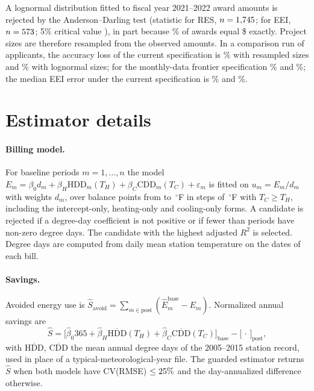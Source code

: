 \documentclass[11pt]{article}
\begin{document}
A lognormal distribution fitted to fiscal year 2021--2022 award amounts is rejected by
the Anderson--Darling test (statistic \AwardFitADRes{} for RES, $n=1{,}745$;
\AwardFitADEei{} for EEI, $n=573$; 5\% critical value \AwardFitADCritical),
in part because \AwardShareAtSmallCap\% of awards equal \$\SmallRequest{} exactly. Project sizes are therefore resampled from
the observed amounts. In a comparison run of \SizeSensN{} applicants, the accuracy loss of
the current specification is \SizeEmpCurrentMare\% with resampled sizes and
\SizeLognCurrentMare\% with lognormal sizes; for the monthly-data frontier specification
\SizeEmpRecMare\% and \SizeLognRecMare\%; the median EEI error under the current
specification is \SizeEmpEeiMedian\% and \SizeLognEeiMedian\%.

{\scriptsize

}

\begin{table}[h]
\caption{Triangular distributions of respondent time (minutes) before calibration.
Hypothetical values.}\label{tab:times}
\centering\footnotesize

\end{table}

\section{Estimator details}

\paragraph{Billing model.} For baseline periods $m=1,\dots,n$ the model
$E_m=\beta_0d_m+\beta_H\mathrm{HDD}_m(T_H)+\beta_C\mathrm{CDD}_m(T_C)+\varepsilon_m$ is
fitted on $u_m=E_m/d_m$ with weights $d_m$, over balance points from \CfgGridLow{} to
\CfgGridHigh$\,^\circ$F in steps of \CfgGridStep$\,^\circ$F with $T_C\ge T_H$, including the intercept-only, heating-only and cooling-only forms. A
candidate is rejected if a degree-day coefficient is not positive or if fewer than
\CfgMinNonzero{} periods have non-zero degree days. The candidate with the highest adjusted $R^2$ is
selected. Degree days are computed from daily mean station temperature on the dates of
each bill.

\paragraph{Savings.} Avoided energy use is
$\hat S_{\mathrm{avoid}}=\sum_{m\in\mathrm{post}}(\hat E^{\mathrm{base}}_m-E_m)$.
Normalized annual savings are
\begin{equation}
\hat S=\big[\hat\beta_0 365+\hat\beta_H\overline{\mathrm{HDD}}(T_H)+\hat\beta_C
\overline{\mathrm{CDD}}(T_C)\big]_{\mathrm{base}}-\big[\,\cdot\,\big]_{\mathrm{post}},
\end{equation}
with $\overline{\mathrm{HDD}}$, $\overline{\mathrm{CDD}}$ the mean annual degree days of
the 2005--2015 station record, used in place of a typical-meteorological-year file. The
guarded estimator returns $\hat S$ when both models have CV(RMSE) $\le25\%$ and
the day-annualized difference otherwise.
\end{document}
